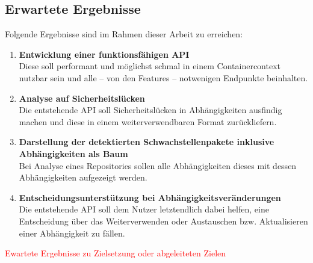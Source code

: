 \subsection{Erwartete Ergebnisse} \label{sec:Erwartete Ergebnisse}
    Folgende Ergebnisse sind im Rahmen dieser Arbeit zu erreichen:
    \begin{enumerate}
        \item \textbf{Entwicklung einer funktionsfähigen API} \\
            Diese soll performant und möglichst schmal in einem Containercontext nutzbar sein und alle -- von den Features -- notwenigen Endpunkte beinhalten.
        \item \textbf{Analyse auf Sicherheitslücken} \\
            Die entstehende API soll Sicherheitslücken in Abhängigkeiten ausfindig machen und diese in einem weiterverwendbaren Format zurückliefern.
        \item \textbf{Darstellung der detektierten Schwachstellenpakete inklusive Abhängigkeiten als Baum} \\
            Bei Analyse eines Repositories sollen alle Abhängigkeiten dieses mit dessen Abhängigkeiten aufgezeigt werden.
        \item \textbf{Entscheidungsunterstützung bei Abhängigkeitsveränderungen} \\
            Die entstehende API soll dem Nutzer letztendlich dabei helfen, eine Entscheidung über das Weiterverwenden oder Austauschen bzw. Aktualisieren einer Abhängigkeit zu fällen.
    \end{enumerate}

    \textcolor{red}{
        Ewartete Ergebnisse zu Zielsetzung oder abgeleiteten Zielen
    }
